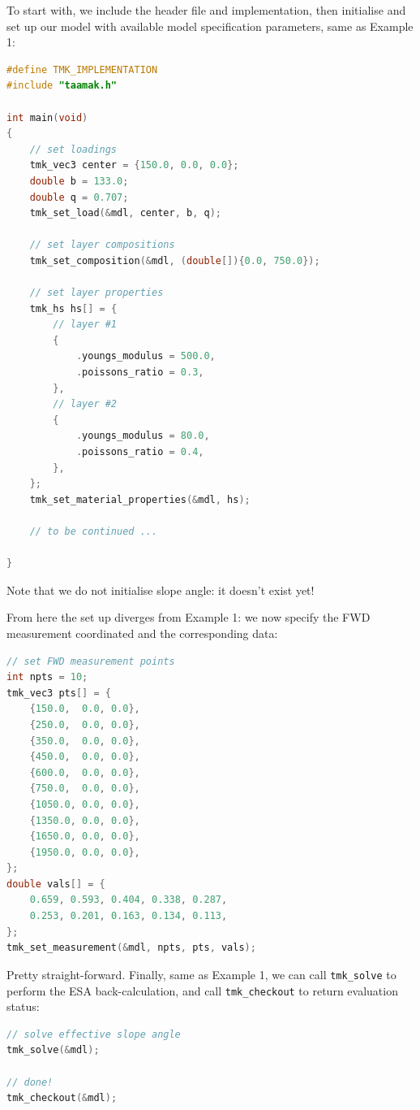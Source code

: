 \documentclass{article}
\begin{document}
To start with, we include the header file and implementation, then initialise and set up our model with available model specification parameters, same as Example 1:
\begin{file}[ex\_02.c]
\begin{lstlisting}[language=C]
#define TMK_IMPLEMENTATION
#include "taamak.h"

int main(void)
{
    // set loadings
    tmk_vec3 center = {150.0, 0.0, 0.0};
    double b = 133.0;
    double q = 0.707;
    tmk_set_load(&mdl, center, b, q);

    // set layer compositions
    tmk_set_composition(&mdl, (double[]){0.0, 750.0});

    // set layer properties
    tmk_hs hs[] = {
        // layer #1
        {
            .youngs_modulus = 500.0,
            .poissons_ratio = 0.3,
        },
        // layer #2
        {
            .youngs_modulus = 80.0,
            .poissons_ratio = 0.4,
        },
    };
    tmk_set_material_properties(&mdl, hs);
    
    // to be continued ...
    
}
\end{lstlisting}
\end{file}

Note that we do not initialise slope angle: it doesn't exist yet! 

From here the set up diverges from Example 1: we now specify the FWD measurement coordinated and the corresponding data:
\begin{file}[ex\_02.c]
\begin{lstlisting}[language=C]
// set FWD measurement points
int npts = 10;
tmk_vec3 pts[] = {
    {150.0,  0.0, 0.0},
    {250.0,  0.0, 0.0},
    {350.0,  0.0, 0.0},
    {450.0,  0.0, 0.0},
    {600.0,  0.0, 0.0},
    {750.0,  0.0, 0.0},
    {1050.0, 0.0, 0.0},
    {1350.0, 0.0, 0.0},
    {1650.0, 0.0, 0.0},
    {1950.0, 0.0, 0.0},
};
double vals[] = {
    0.659, 0.593, 0.404, 0.338, 0.287, 
    0.253, 0.201, 0.163, 0.134, 0.113,
};
tmk_set_measurement(&mdl, npts, pts, vals);
\end{lstlisting}
\end{file}

Pretty straight-forward. Finally, same as Example 1, we can call \texttt{tmk\_solve} to perform the ESA back-calculation, and call \texttt{tmk\_checkout} to return evaluation status:
\begin{file}[ex\_02.c]
\begin{lstlisting}[language=C]
// solve effective slope angle
tmk_solve(&mdl);

// done!
tmk_checkout(&mdl);
\end{lstlisting}
\end{file}
\end{document}
